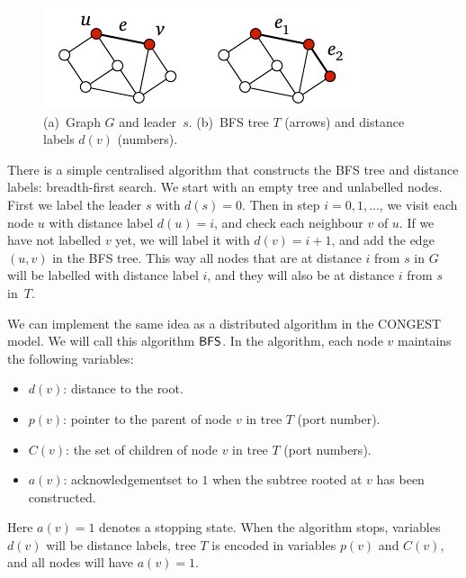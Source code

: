 \begin{figure}
    \centering
    \includegraphics[page=\PBFS]{figs.pdf}
    \caption{(a)~Graph $G$ and leader~$s$. (b)~BFS tree $T$ (arrows) and distance labels $d(v)$ (numbers).}\label{fig:bfs}
\end{figure}

There is a simple centralised algorithm that constructs the BFS tree and distance labels: breadth-first search. We start with an empty tree and unlabelled nodes. First we label the leader $s$ with $d(s) = 0$. Then in step $i = 0, 1, \dotsc$, we visit each node $u$ with distance label $d(u) = i$, and check each neighbour $v$ of $u$. If we have not labelled $v$ yet, we will label it with $d(v) = i+1$, and add the edge $(u,v)$ in the BFS tree. This way all nodes that are at distance $i$ from $s$ in $G$ will be labelled with distance label $i$, and they will also be at distance $i$ from $s$ in~$T$.

We can implement the same idea as a distributed algorithm in the CONGEST model. We will call this algorithm $\textup{\sffamily BFS}$. In the algorithm, each node $v$ maintains the following variables:
\begin{itemize}
    \item $d(v)$: distance to the root.
    \item $p(v)$: pointer to the parent of node $v$ in tree $T$ (port number).
    \item $C(v)$: the set of children of node $v$ in tree $T$ (port numbers).
    \item $a(v)$: acknowledgement\mydash set to $1$ when the subtree rooted at $v$ has been constructed.
\end{itemize}
Here $a(v) = 1$ denotes a stopping state. When the algorithm stops, variables $d(v)$ will be distance labels, tree $T$ is encoded in variables $p(v)$ and $C(v)$, and all nodes will have $a(v) = 1$.

